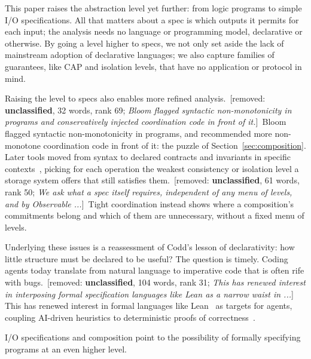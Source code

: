 \documentclass[sigconf]{cidr-2027}
\theoremstyle{remark}
\newcommand{\commitments}{commitments\xspace}
\newcommand{\spectype}[1][]{I/O specification#1\xspace}
\newcommand{\removednote}[1]{{\color{cutred}\footnotesize\,[removed: #1]\,}}
\begin{document}
  
\textcolor{newblue}{This paper raises the abstraction level yet further: from logic programs to simple
\spectype[s].} All that matters about a spec is which outputs it
permits for each input; the analysis needs no language or programming model,
declarative or otherwise. By going a level higher to specs, we not only set
aside the lack of mainstream adoption of declarative languages; we also capture
families of guarantees, like CAP and isolation levels, that have no application
or protocol in mind.




\textcolor{newblue}{Raising the level to specs also enables more refined analysis.} \removednote{\textbf{unclassified}, 32 words, rank 69; \textit{Bloom flagged syntactic non-monotonicity in programs and conservatively injected coordination code in front of it.}} \textcolor{newblue}{Bloom~\cite{alvaro2011bloom} flagged syntactic non-monotonicity in programs,
and recommended more non-monotone coordination code in front of it: the puzzle of
Section~\ref{sec:composition}.} \textcolor{newblue}{Later tools moved from syntax to declared
contracts and invariants in specific
contexts~\cite{sivaramakrishnan2015quelea,kaki2018alone}, picking for each
operation the weakest consistency or isolation level a storage system offers that still
satisfies them.} \removednote{\textbf{unclassified}, 61 words, rank 50; \textit{We ask what a spec itself requires, independent of any menu of levels, and by Observable ...}} \textcolor{newblue}{Tight coordination instead shows where a composition's \commitments belong and which of them are unnecessary, without a fixed menu of levels.}

\textcolor{newblue}{Underlying these issues is a reassessment of Codd's lesson of declarativity: how
little structure must be declared to be
useful?} The question is timely. \textcolor{newblue}{Coding agents today translate from natural
language to imperative code that is often rife with bugs.} \removednote{\textbf{unclassified}, 104 words, rank 31; \textit{This has renewed interest in interposing formal specification languages like Lean as a narrow waist in ...}} \textcolor{newblue}{This has renewed
interest in formal languages like
Lean~\cite{demoura2021lean4} as targets for agents,
coupling AI-driven heuristics to deterministic proofs of
correctness~\cite{hellerstein2023codd,an2025neurosymbolic}.}



\textcolor{newblue}{\spectype[s] and composition point to the possibility of
formally specifying programs at an even higher level.}
\end{document}
